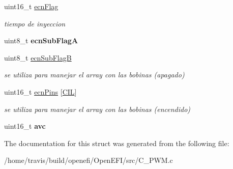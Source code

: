 \begin{DoxyCompactItemize}
uint16\+\_\+t \hyperlink{structC__PWM_a6b4fd2b57fa098738a9151c875fcef5d}{ecn\+Flag}
\begin{DoxyCompactList}\small\item\em tiempo de inyeccion \end{DoxyCompactList}\item 
\mbox{\label{structC__PWM_a62a07953814c9825c4aefedf48aed271}} 
uint8\+\_\+t {\bfseries ecn\+Sub\+FlagA}
\item 
\mbox{\label{structC__PWM_a834c8d7daeba6800e4055f62ce394455}} 
uint8\+\_\+t \hyperlink{structC__PWM_a834c8d7daeba6800e4055f62ce394455}{ecn\+Sub\+FlagB}
\begin{DoxyCompactList}\small\item\em se utiliza para manejar el array con las bobinas (apagado) \end{DoxyCompactList}\item 
\mbox{\label{structC__PWM_addb10bf1c8d33c1f3193c17c2ea62205}} 
uint16\+\_\+t \hyperlink{structC__PWM_addb10bf1c8d33c1f3193c17c2ea62205}{ecn\+Pins} \mbox{[}\hyperlink{defines_8h_a45f252e6f7774e84484118243dfe45b4}{C\+IL}\mbox{]}
\begin{DoxyCompactList}\small\item\em se utiliza para manejar el array con las bobinas (encendido) \end{DoxyCompactList}\item 
\mbox{\label{structC__PWM_a25ba9a9a31731f3c304b398a9f1ac108}} 
uint16\+\_\+t {\bfseries avc}
\end{DoxyCompactItemize}


The documentation for this struct was generated from the following file\+:\begin{DoxyCompactItemize}
\item 
/home/travis/build/openefi/\+Open\+E\+F\+I/src/C\+\_\+\+P\+W\+M.\+c\end{DoxyCompactItemize}
